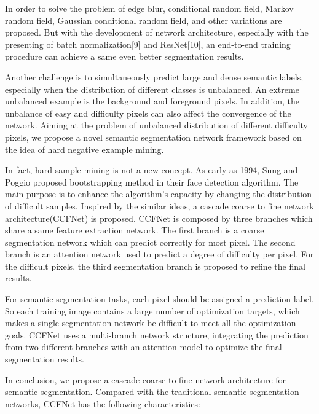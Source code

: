 \documentclass[10.5pt,compsoc]{TsT}
\theoremstyle{mystyle}
\begin{document}
{In order to solve the problem of edge blur, conditional random field, Markov random field, Gaussian conditional random field, and other variations are proposed.
But with the development of network architecture, especially with the presenting of batch normalization[9] and ResNet[10], an end-to-end training procedure can achieve a same even better segmentation results.


Another challenge is to simultaneously predict large and dense semantic labels, especially when the distribution of different classes is unbalanced.
An extreme unbalanced example is the background and foreground pixels.
In addition, the unbalance of easy and difficulty pixels can also affect the convergence of the network.
Aiming at the problem of unbalanced distribution of different difficulty pixels, we propose a novel semantic segmentation network framework based on the idea of hard negative example mining.

In fact, hard sample mining is not a new concept. As early as 1994, Sung and Poggio proposed bootstrapping method in their face detection algorithm.
The main purpose is to  enhance the algorithm's capacity by changing the distribution of difficult samples.
Inspired by the similar ideas, a cascade coarse to fine network architecture(CCFNet) is proposed.
CCFNet is composed by three branches which share a same feature extraction network.
The first branch is a coarse segmentation network which can predict correctly for most pixel.
The second branch is an attention network used to predict a degree of difficulty per pixel.
For the difficult pixels, the third segmentation branch is proposed to refine the final results.

For semantic segmentation tasks, each pixel should be assigned a prediction label.
So each training image contains a large number of optimization targets, which makes a single segmentation network be difficult to meet all the optimization goals.
CCFNet uses a multi-branch network structure, integrating the prediction from two different branches with an attention model to optimize the final segmentation results.

In conclusion, we propose a cascade coarse to fine network architecture for semantic segmentation.
Compared with the traditional semantic segmentation networks, CCFNet has the following characteristics: 


}
\end{document}
